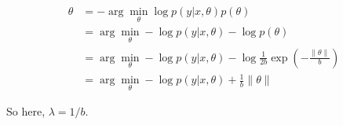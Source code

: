 \begin{answer}
$$
    \begin{aligned}
\theta &= -\arg \min_\theta \log p(y|x, \theta)p(\theta)\\
&= \arg \min_\theta -\log p(y|x, \theta) - \log p(\theta)\\
&= \arg \min_\theta -\log p(y|x, \theta) - \log \frac{1}{2b}\exp(-\frac{\|\theta\|}{b})\\
&= \arg \min_\theta -\log p(y|x, \theta) + \frac{1}{b}\|\theta\|
\end{aligned}
$$

So here, $\lambda = 1/ b$.

\end{answer}
